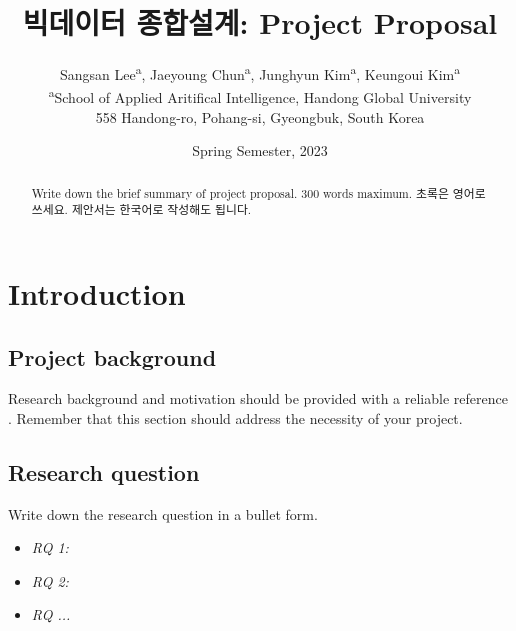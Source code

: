 \documentclass[11pt]{article}
\begin{document}
           

    \title{빅데이터 종합설계: Project Proposal}          
    \author{Sangsan Lee\textsuperscript{a},
        Jaeyoung Chun\textsuperscript{a},
        Junghyun Kim\textsuperscript{a},
        Keungoui Kim\textsuperscript{a}\\
    {\small \textsuperscript{a}School of Applied Aritifical Intelligence, Handong Global University}\\
    {\small 558 Handong-ro, Pohang-si, Gyeongbuk, South Korea}\\
        }

    \date{Spring Semester, 2023}      

 
    \maketitle                 
 
    \begin{abstract}
        Write down the brief summary of project proposal.
        300 words maximum. 초록은 영어로 쓰세요. 제안서는
        한국어로 작성해도 됩니다.
    \end{abstract}

    \tableofcontents
    \newpage
    
    \section{Introduction} 
    \subsection{Project background}
    Research background and motivation should be provided
    with a reliable reference \citep{Kim2018f, Kim2022}.    
    Remember that this section should address the 
    necessity of your project. 
    
    \subsection{Research question}
    Write down the research question in a bullet form.

    \begin{itemize}
        \item \emph{RQ 1: ~~}
        \item \emph{RQ 2: ~~}
        \item \emph{RQ ...}
    \end{itemize}
\end{document}
